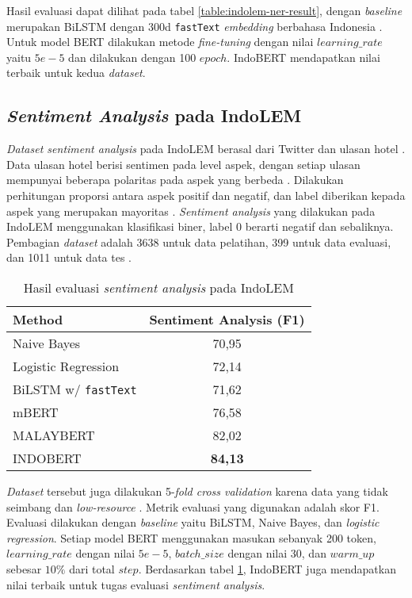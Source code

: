 Hasil evaluasi dapat dilihat pada tabel \ref{table:indolem-ner-result}, dengan \textit{baseline} merupakan BiLSTM dengan 300d \texttt{fastText} \textit{embedding} berbahasa Indonesia \parencite{indolem}. Untuk model BERT dilakukan metode \textit{fine-tuning} dengan nilai $learning\_rate$ yaitu $5e-5$ dan dilakukan dengan 100 $epoch$. IndoBERT mendapatkan nilai terbaik untuk kedua \textit{dataset}.

\subsection{\textit{Sentiment Analysis} pada IndoLEM}

\textit{Dataset sentiment analysis} pada IndoLEM berasal dari Twitter dan ulasan hotel \parencite{indolem}. Data ulasan hotel berisi sentimen pada level aspek, dengan setiap ulasan mempunyai beberapa polaritas pada aspek yang berbeda \parencite{indolem}. Dilakukan perhitungan proporsi antara aspek positif dan negatif, dan label diberikan kepada aspek yang merupakan mayoritas \parencite{indolem}. \textit{Sentiment analysis} yang dilakukan pada IndoLEM menggunakan klasifikasi biner, label 0 berarti negatif dan sebaliknya. Pembagian \textit{dataset} adalah 3638 untuk data pelatihan, 399 untuk data evaluasi, dan 1011 untuk data tes \parencite{indolem}. 

\begin{table}[h]
    \vspace{0.25cm}
    \centering
    \caption{Hasil evaluasi \textit{sentiment analysis} pada IndoLEM}
    \label{table:indolem-sentiment-result}
    \begin{tabular}{lc}
        \toprule
        \textbf{Method} & \textbf{Sentiment Analysis (F1)} \\
        \midrule
        Naive Bayes & 70,95 \\
        Logistic Regression & 72,14 \\
        BiLSTM w/ \texttt{fastText} & 71,62 \\
        mBERT & 76,58 \\
        MALAYBERT & 82,02 \\
        INDOBERT & \textbf{84,13} \\
        \bottomrule
    \end{tabular}
\end{table}

\textit{Dataset} tersebut juga dilakukan 5-\textit{fold cross validation} karena data yang tidak seimbang dan \textit{low-resource} \parencite{indolem}. Metrik evaluasi yang digunakan adalah skor F1. Evaluasi dilakukan dengan \textit{baseline} yaitu BiLSTM, Naive Bayes, dan \textit{logistic regression}. Setiap model BERT menggunakan masukan sebanyak 200 token, $learning\_rate$ dengan nilai $5e-5$, $batch\_size$ dengan nilai 30, dan $warm\_up$ sebesar $10\%$ dari total $step$. Berdasarkan tabel \ref{table:indolem-sentiment-result}, IndoBERT juga mendapatkan nilai terbaik untuk tugas evaluasi \textit{sentiment analysis}.

